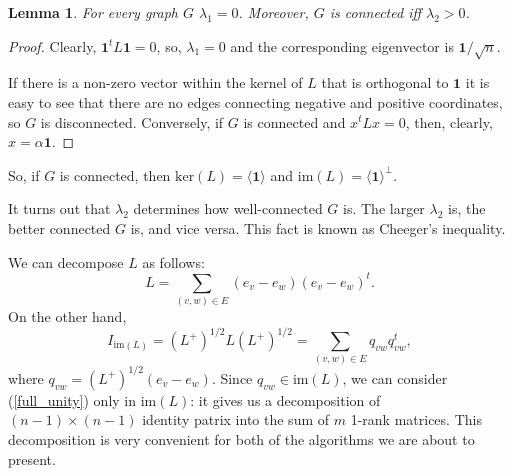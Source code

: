 \documentclass[12pt]{article}
\newtheorem{lemma}{Lemma}
\begin{document}
    \begin{lemma}
        For every graph $G$ $\lambda_1 = 0$. Moreover, $G$ is connected iff $\lambda_2 > 0$.
    \end{lemma}
    \begin{proof}
        Clearly, $\mathbf{1}^t L \mathbf{1} = 0$, so, $\lambda_1 = 0$ and the corresponding
        eigenvector is $\mathbf{1} / \sqrt{n}$.

        If there is a non-zero
        vector within the kernel of $L$ that is orthogonal to $\mathbf{1}$
        it is easy to see that there are no edges connecting negative and positive
        coordinates, so $G$ is disconnected. Conversely, if $G$ is connected and
        $x^t L x = 0$, then, clearly, $x = \alpha \mathbf{1}$.
    \end{proof}

    So, if $G$ is connected, then $\mathrm{ker}(L) = \langle \mathbf{1} \rangle$
    and $\mathrm{im}(L) = \langle \mathbf{1} \rangle^{\perp}$.

    It turns out that $\lambda_2$ determines how well-connected $G$ is. The larger
    $\lambda_2$ is, the better connected $G$ is, and vice versa. This fact is known
    as Cheeger's inequality.

    We can decompose $L$ as follows:
    $$
        L = \sum_{(v,w) \in E} (e_v - e_w) (e_v - e_w)^t.
    $$
    On the other hand,
    \begin{equation}
        \label{full_unity}
        I_{\mathrm{im}(L)} = (L^+)^{1/2} L (L^+)^{1/2} = \sum_{(v,w) \in E} q_{vw} q_{vw}^t,
    \end{equation}
    where $q_{vw} = (L^+)^{1/2} (e_v - e_w)$. Since $q_{vw} \in \mathrm{im}(L)$, we can
    consider (\ref{full_unity}) only in $\mathrm{im}(L)$: it gives us a decomposition of
    $(n-1)\times(n-1)$ identity patrix into the sum of $m$ 1-rank matrices.
    This decomposition is very convenient for both of the algorithms we are about to
    present.
\end{document}
